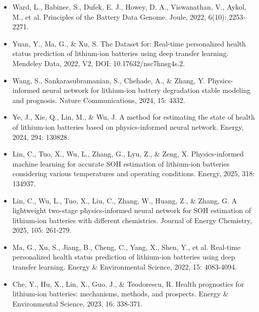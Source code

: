 \documentclass[12pt, a4paper]{ctexart}
\begin{document}
\begin{itemize}
  \item  Ward, L., Babinec, S., Dufek, E. J., Howey, D. A., Viswanathan, V., Aykol, M., et al. Principles of the Battery Data Genome. Joule, 2022, 6(10): 2253-2271.
\end{itemize}
\begin{itemize}
  \item  Yuan, Y., Ma, G., \& Xu, S. The Dataset for: Real-time personalized health status prediction of lithium-ion batteries using deep transfer learning. Mendeley Data, 2022, V2, DOI: 10.17632/nsc7hnsg4s.2.
\end{itemize}
\begin{itemize}
  \item  Wang, S., Sankarasubramanian, S., Chehade, A., \& Zhang, Y. Physics-informed neural network for lithium-ion battery degradation stable modeling and prognosis. Nature Communications, 2024, 15: 4332.
\end{itemize}
\begin{itemize}
  \item  Ye, J., Xie, Q., Lin, M., \& Wu, J. A method for estimating the state of health of lithium-ion batteries based on physics-informed neural network. Energy, 2024, 294: 130828.
\end{itemize}
\begin{itemize}
  \item  Lin, C., Tuo, X., Wu, L., Zhang, G., Lyu, Z., \& Zeng, X. Physics-informed machine learning for accurate SOH estimation of lithium-ion batteries considering various temperatures and operating conditions. Energy, 2025, 318: 134937.
\end{itemize}
\begin{itemize}
  \item  Lin, C., Wu, L., Tuo, X., Liu, C., Zhang, W., Huang, Z., \& Zhang, G. A lightweight two-stage physics-informed neural network for SOH estimation of lithium-ion batteries with different chemistries. Journal of Energy Chemistry, 2025, 105: 261-279.
\end{itemize}
\begin{itemize}
  \item  Ma, G., Xu, S., Jiang, B., Cheng, C., Yang, X., Shen, Y., et al. Real-time personalized health status prediction of lithium-ion batteries using deep transfer learning. Energy \& Environmental Science, 2022, 15: 4083-4094.
\end{itemize}
\begin{itemize}
  \item  Che, Y., Hu, X., Lin, X., Guo, J., \& Teodorescu, R. Health prognostics for lithium-ion batteries: mechanisms, methods, and prospects. Energy \& Environmental Science, 2023, 16: 338-371.
\end{itemize}
\end{document}
